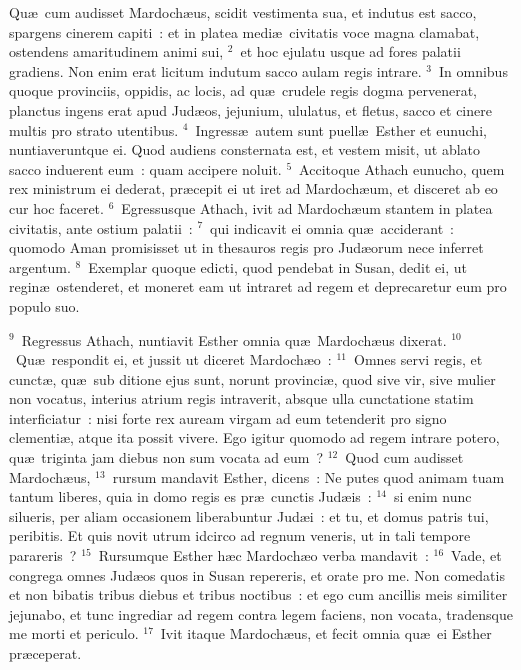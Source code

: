 \lettrine[lines=10,image=true,loversize=0.05,lraise=-0.03]{Q}{}u\ae\ cum audisset Mardoch\ae us, scidit vestimenta sua, et indutus est sacco, spargens cinerem capiti~: et in platea medi\ae\ civitatis voce magna clamabat, ostendens amaritudinem animi sui,
${}^{2}$~et hoc ejulatu usque ad fores palatii gradiens. Non enim erat licitum indutum sacco aulam regis intrare.
${}^{3}$~In omnibus quoque provinciis, oppidis, ac locis, ad qu\ae\ crudele regis dogma pervenerat, planctus ingens erat apud Jud\ae os, jejunium, ululatus, et fletus, sacco et cinere multis pro strato utentibus.
${}^{4}$~Ingress\ae\ autem sunt puell\ae\ Esther et eunuchi, nuntiaveruntque ei. Quod audiens consternata est, et vestem misit, ut ablato sacco induerent eum~: quam accipere noluit.
${}^{5}$~Accitoque Athach eunucho, quem rex ministrum ei dederat, pr\ae cepit ei ut iret ad Mardoch\ae um, et disceret ab eo cur hoc faceret.
${}^{6}$~Egressusque Athach, ivit ad Mardoch\ae um stantem in platea civitatis, ante ostium palatii~:
${}^{7}$~qui indicavit ei omnia qu\ae\ acciderant~: quomodo Aman promisisset ut in thesauros regis pro Jud\ae orum nece inferret argentum.
${}^{8}$~Exemplar quoque edicti, quod pendebat in Susan, dedit ei, ut regin\ae\ ostenderet, et moneret eam ut intraret ad regem et deprecaretur eum pro populo suo.


${}^{9}$~Regressus Athach, nuntiavit Esther omnia qu\ae\ Mardoch\ae us dixerat.
${}^{10}$~Qu\ae\ respondit ei, et jussit ut diceret Mardoch\ae o~:
${}^{11}$~Omnes servi regis, et cunct\ae , qu\ae\ sub ditione ejus sunt, norunt provinci\ae , quod sive vir, sive mulier non vocatus, interius atrium regis intraverit, absque ulla cunctatione statim interficiatur~: nisi forte rex auream virgam ad eum tetenderit pro signo clementi\ae , atque ita possit vivere. Ego igitur quomodo ad regem intrare potero, qu\ae\ triginta jam diebus non sum vocata ad eum~?
${}^{12}$~Quod cum audisset Mardoch\ae us,
${}^{13}$~rursum mandavit Esther, dicens~: Ne putes quod animam tuam tantum liberes, quia in domo regis es pr\ae\ cunctis Jud\ae is~:
${}^{14}$~si enim nunc silueris, per aliam occasionem liberabuntur Jud\ae i~: et tu, et domus patris tui, peribitis. Et quis novit utrum idcirco ad regnum veneris, ut in tali tempore parareris~?
${}^{15}$~Rursumque Esther h\ae c Mardoch\ae o verba mandavit~:
${}^{16}$~Vade, et congrega omnes Jud\ae os quos in Susan repereris, et orate pro me. Non comedatis et non bibatis tribus diebus et tribus noctibus~: et ego cum ancillis meis similiter jejunabo, et tunc ingrediar ad regem contra legem faciens, non vocata, tradensque me morti et periculo.
${}^{17}$~Ivit itaque Mardoch\ae us, et fecit omnia qu\ae\ ei Esther pr\ae ceperat.

